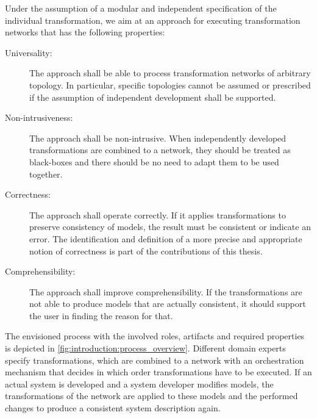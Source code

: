 Under the assumption of a modular and independent specification of the individual transformation, we aim at an approach for executing transformation networks that has the following properties:
\begin{description}
    \item[Universality:] The approach shall be able to process transformation networks of arbitrary topology. In particular, specific topologies cannot be assumed or prescribed if the assumption of independent development shall be supported.
    \item[Non-intrusiveness:] The approach shall be non-intrusive. When independently developed transformations are combined to a network, they should be treated as black-boxes and there should be no need to adapt them to be used together.
    \item[Correctness:] The approach shall operate correctly. If it applies transformations to preserve consistency of models, the result must be consistent or indicate an error. The identification and definition of a more precise and appropriate notion of correctness is part of the contributions of this thesis.
    \item[Comprehensibility:] The approach shall improve comprehensibility. If the transformations are not able to produce models that are actually consistent, it should support the user in finding the reason for that.
\end{description}
The envisioned process with the involved roles, artifacts and required properties is depicted in \autoref{fig:introduction:process_overview}.
Different domain experts specify transformations, which are combined to a network with an orchestration mechanism that decides in which order transformations have to be executed. If an actual system is developed and a system developer modifies models, the transformations of the network are applied to these models and the performed changes to produce a consistent system description again.

